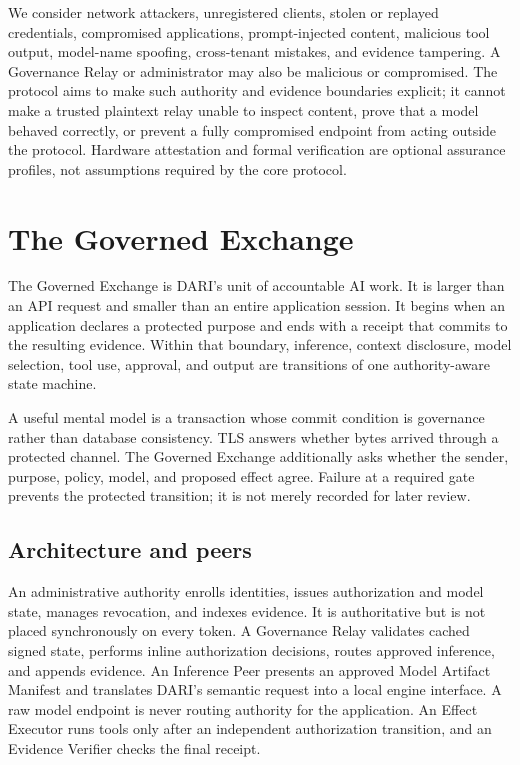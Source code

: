 \documentclass[10pt]{article}
\begin{document}
We consider network attackers, unregistered clients, stolen or replayed credentials, compromised applications, prompt-injected content, malicious tool output, model-name spoofing, cross-tenant mistakes, and evidence tampering. A Governance Relay or administrator may also be malicious or compromised. The protocol aims to make such authority and evidence boundaries explicit; it cannot make a trusted plaintext relay unable to inspect content, prove that a model behaved correctly, or prevent a fully compromised endpoint from acting outside the protocol. Hardware attestation and formal verification are optional assurance profiles, not assumptions required by the core protocol.

\section{The Governed Exchange}

The Governed Exchange is DARI's unit of accountable AI work. It is larger than an API request and smaller than an entire application session. It begins when an application declares a protected purpose and ends with a receipt that commits to the resulting evidence. Within that boundary, inference, context disclosure, model selection, tool use, approval, and output are transitions of one authority-aware state machine.

A useful mental model is a transaction whose commit condition is governance rather than database consistency. TLS answers whether bytes arrived through a protected channel. The Governed Exchange additionally asks whether the sender, purpose, policy, model, and proposed effect agree. Failure at a required gate prevents the protected transition; it is not merely recorded for later review.

\subsection{Architecture and peers}

An administrative authority enrolls identities, issues authorization and model state, manages revocation, and indexes evidence. It is authoritative but is not placed synchronously on every token. A Governance Relay validates cached signed state, performs inline authorization decisions, routes approved inference, and appends evidence. An Inference Peer presents an approved Model Artifact Manifest and translates DARI's semantic request into a local engine interface. A raw model endpoint is never routing authority for the application. An Effect Executor runs tools only after an independent authorization transition, and an Evidence Verifier checks the final receipt.
\end{document}
